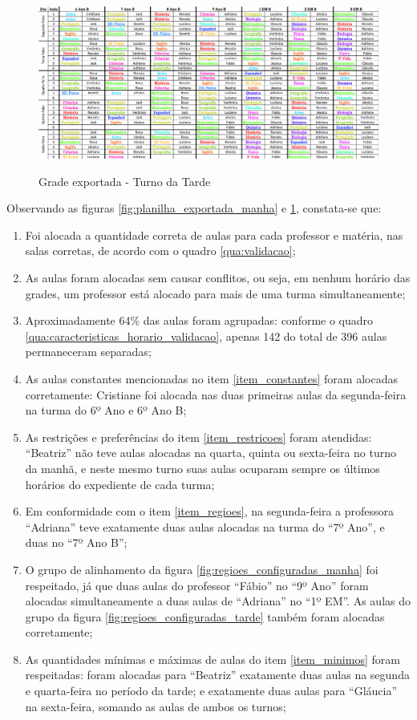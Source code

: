 \begin{figure}
	\centering
	\caption{Grade exportada - Turno da Tarde}
	\includegraphics[width=1\textwidth]{./dados/figuras/planilha_exportada_tarde}
	\label{fig:planilha_exportada_tarde}
\end{figure}
\pagebreak

Observando as figuras \ref{fig:planilha_exportada_manha} e \ref{fig:planilha_exportada_tarde}, constata-se que:

\begin{enumerate}
	\item Foi alocada a quantidade correta de aulas para cada professor e matéria, nas salas corretas, de acordo com o quadro \ref{qua:validacao};
	\item As aulas foram alocadas sem causar conflitos, ou seja, em nenhum horário das grades, um professor está alocado para mais de uma turma simultaneamente;
	\item Aproximadamente 64\% das aulas foram agrupadas: conforme o quadro \ref{qua:caracteristicas_horario_validacao}, apenas 142 do total de 396 aulas permaneceram separadas;
	\item As aulas constantes mencionadas no item \ref{item_constantes} foram alocadas corretamente: Cristiane foi alocada nas duas primeiras aulas da segunda-feira na turma do 6º Ano e 6º Ano B;
	\item As restrições e preferências do item \ref{item_restricoes} foram atendidas: ``Beatriz'' não teve aulas alocadas na quarta, quinta ou sexta-feira no turno da manhã, e neste mesmo turno suas aulas ocuparam sempre os últimos horários do expediente de cada turma;
	\item Em conformidade com o item \ref{item_regioes}, na segunda-feira a professora ``Adriana'' teve exatamente duas aulas alocadas na turma do ``7º Ano'', e duas no ``7º Ano B'';
	\item O grupo de alinhamento da figura \ref{fig:regioes_configuradas_manha} foi respeitado, já que duas aulas do professor ``Fábio'' no ``9º Ano'' foram alocadas simultaneamente a duas aulas de ``Adriana'' no ``1º EM''. As aulas do grupo da figura \ref{fig:regioes_configuradas_tarde} também foram alocadas corretamente;
	\item As quantidades mínimas e máximas de aulas do item \ref{item_minimos} foram respeitadas: foram alocadas para ``Beatriz'' exatamente duas aulas na segunda e quarta-feira no período da tarde; e exatamente duas aulas para ``Gláucia'' na sexta-feira, somando as aulas de ambos os turnos;
\end{enumerate}






